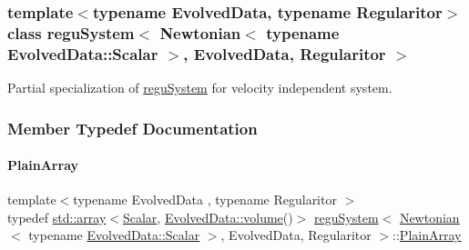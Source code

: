\subsubsection*{template$<$typename Evolved\+Data, typename Regularitor$>$\newline
class regu\+System$<$ Newtonian$<$ typename Evolved\+Data\+::\+Scalar $>$, Evolved\+Data, Regularitor $>$}

Partial specialization of \mbox{\hyperlink{classregu_system}{regu\+System}} for velocity independent system. 

\subsubsection{Member Typedef Documentation}
\mbox{\label{classregu_system_3_01_newtonian_3_01typename_01_evolved_data_1_1_scalar_01_4_00_01_evolved_data_00_01_regularitor_01_4_a26da8a1ed92e5aced3615da524ef37b3}} 
\paragraph{\texorpdfstring{Plain\+Array}{PlainArray}}
{\footnotesize\ttfamily template$<$typename Evolved\+Data , typename Regularitor $>$ \\
typedef \mbox{\hyperlink{classparticle_system_a1817956f802188c82c12c223c32bd28a}{std\+::array}}$<$\mbox{\hyperlink{classregu_system_3_01_newtonian_3_01typename_01_evolved_data_1_1_scalar_01_4_00_01_evolved_data_00_01_regularitor_01_4_a6993f135075541f441a7642845b183a5}{Scalar}}, \mbox{\hyperlink{classregu_system_a4260b237d36d137b01504c0effd385fa}{Evolved\+Data\+::volume}}()$>$ \mbox{\hyperlink{classregu_system}{regu\+System}}$<$ \mbox{\hyperlink{class_newtonian}{Newtonian}}$<$ typename \mbox{\hyperlink{classregu_system_aca8ee2c387943164ee3ea68370fc3ac0}{Evolved\+Data\+::\+Scalar}} $>$, Evolved\+Data, Regularitor $>$\+::\mbox{\hyperlink{classregu_system_3_01_newtonian_3_01typename_01_evolved_data_1_1_scalar_01_4_00_01_evolved_data_00_01_regularitor_01_4_a26da8a1ed92e5aced3615da524ef37b3}{Plain\+Array}}}

